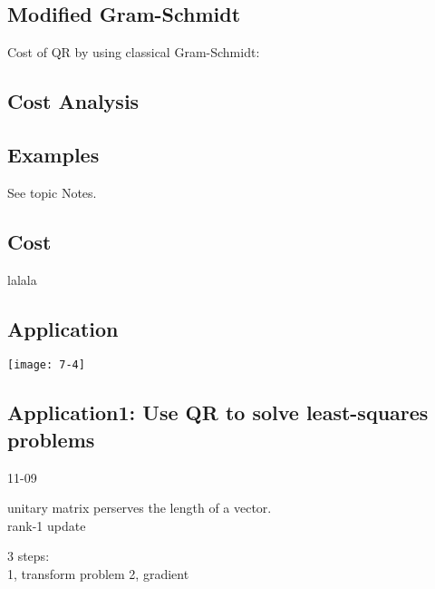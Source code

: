 \documentclass{article}
\begin{document}
\subsection{Modified Gram-Schmidt}

Cost of QR by using classical Gram-Schmidt:\\


\subsection*{Cost Analysis}







\subsection*{Examples}
See topic Notes.

\subsection*{Cost}
lalala

\subsection*{Application}
\texttt{[image: 7-4]}\\

\subsection*{Application1: Use QR to solve least-squares problems}
11-09

unitary matrix perserves the length of a vector.\\

rank-1 update

3 steps:\\
1, transform problem %
2, gradient 
\end{document}

